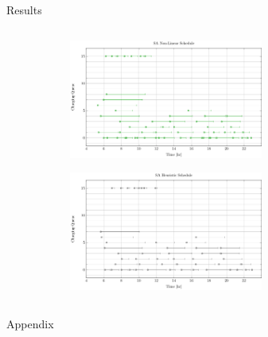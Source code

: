 \documentclass[aspectratio=169]{beamer}
\begin{document}
\begin{frame}[label={sec:orge184ebb}]{Results}
\begin{columns}
\begin{column}{0.5\columnwidth}
\begin{figure}
\begin{subfigure}[t]{\textwidth}
\centering
    \includegraphics[width=0.7\textwidth]{img/sa-nonlinear/schedule-sa-nonlinear}
\end{subfigure}
\begin{subfigure}[t]{\textwidth}
\centering
    \includegraphics[width=0.7\textwidth]{img/sa-pap-paper-good/schedule-sa-heuristic}
\end{subfigure}
\end{figure}
\end{column}
\end{columns}
\end{frame}

\appendix
\begin{frame}[label={sec:org6ad3c85}]{Appendix}
\end{frame}
\end{document}
